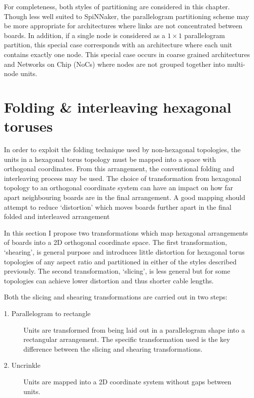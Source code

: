 		For completeness, both styles of partitioning are considered in this
		chapter. Though less well suited to SpiNNaker, the parallelogram
		partitioning scheme may be more appropriate for architectures where links
		are not concentrated between boards. In addition, if a single node is
		considered as a $1 \times 1$ parallelogram partition, this special case
		corresponds with an architecture where each unit contains exactly one node.
		This special case occurs in coarse grained architectures and Networks on
		Chip (NoCs) where nodes are not grouped together into multi-node units.
	
	\section{Folding \& interleaving hexagonal toruses}
		
		In order to exploit the folding technique used by non-hexagonal topologies,
		the units in a hexagonal torus topology must be mapped into a space with
		orthogonal coordinates. From this arrangement, the conventional folding and
		interleaving process may be used. The choice of transformation from
		hexagonal topology to an orthogonal coordinate system can have an impact on
		how far apart neighbouring boards are in the final arrangement. A good
		mapping should attempt to reduce `distortion' which moves boards further
		apart in the final folded and interleaved arrangement
		
		In this section I propose two transformations which map hexagonal
		arrangements of boards into a 2D orthogonal coordinate space. The first
		transformation, `shearing', is general purpose and introduces little
		distortion for hexagonal torus topologies of any aspect ratio and
		partitioned in either of the styles described previously. The second
		transformation, `slicing', is less general but for some topologies can
		achieve lower distortion and thus shorter cable lengths.
		
		Both the slicing and shearing transformations are carried out in two steps:
		
		\begin{description}
			
			\item[1. Parallelogram to rectangle] Units are transformed from being
			laid out in a parallelogram shape into a rectangular arrangement. The
			specific transformation used is the key difference between the slicing
			and shearing transformations.
			
			\item[2. Uncrinkle] Units are mapped into a 2D coordinate system without
			gaps between units.
			
		\end{description}
		
